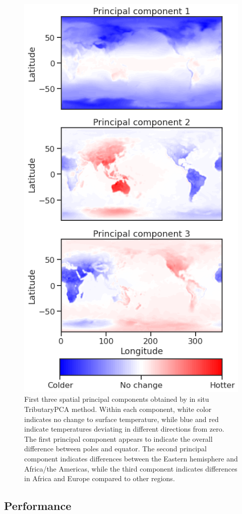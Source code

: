 \documentclass{juliacon}
\begin{document}
\begin{figure}
    \centering
    \includegraphics[width=0.8\linewidth]{figures/insitu_pca.png}
    \caption{First three spatial principal components obtained by in situ TributaryPCA method. Within each component, white color indicates no change to surface temperature, while blue and red indicate temperatures deviating in different directions from zero. The first principal component appears to indicate the overall difference between poles and equator. The second principal component indicates differences between the Eastern hemisphere and Africa/the Americas, while the third component indicates differences in Africa and Europe compared to other regions.}
    \label{fig:pca_results}
\end{figure}

\subsection{Performance}
\end{document}
